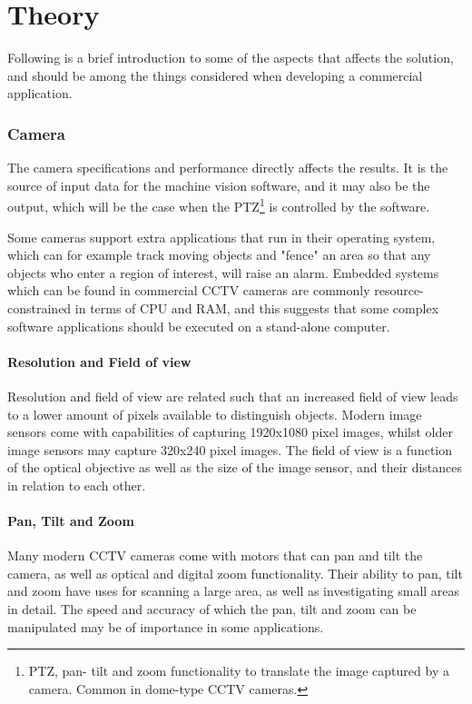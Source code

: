 \chapter{Theory}
\label{ch:chapter2}
Following is a brief introduction to some of the aspects that affects the solution, and should be among the things considered when developing a commercial application.
\subsection{Camera}
The camera specifications and performance directly affects the results. It is the source of input data for the machine vision software, and it may also be the output, which will be the case when the PTZ\footnote{PTZ, pan- tilt and zoom functionality to translate the image captured by a camera. Common in dome-type CCTV cameras.} is controlled by the software.

Some cameras support extra applications that run in their operating system, which can for example track moving objects and "fence" an area so that any objects who enter a region of interest, will raise an alarm.
Embedded systems which can be found in commercial CCTV cameras are commonly resource-constrained in terms of CPU and RAM, and this suggests that some complex software applications should be executed on a stand-alone computer.

\subsubsection{Resolution and Field of view}
Resolution and field of view are related such that an increased field of view leads to a lower amount of pixels available to distinguish objects. Modern image sensors come with capabilities of capturing 1920x1080 pixel images, whilst older image sensors may capture 320x240 pixel images.
The field of view is a function of the optical objective as well as the size of the image sensor, and their distances in relation to each other.

\subsubsection{Pan, Tilt and Zoom}
Many modern CCTV cameras come with motors that can pan and tilt the camera, as well as optical and digital zoom functionality. Their ability to pan, tilt and zoom have uses for scanning a large area, as well as investigating small areas in detail.
The speed and accuracy of which the pan, tilt and zoom can be manipulated may be of importance in some applications.

